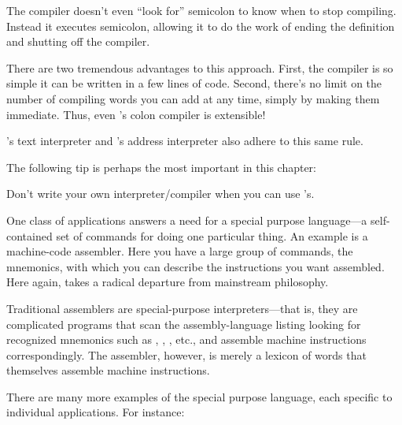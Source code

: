 The compiler doesn't even ``look for'' semicolon to know when to
stop compiling. Instead it executes semicolon, allowing it to do the work
of ending the definition and shutting off the compiler.

There are two tremendous advantages to this approach. First, the
compiler is so simple it can be written in a few lines of code. Second,
there's no limit on the number of compiling words you can add at any
time, simply by making them immediate. Thus, even \Forth{}'s colon
compiler is extensible!

\Forth{}'s text interpreter and \Forth{}'s address interpreter also
adhere to this same rule.

The following tip is perhaps the most important in this chapter:


\begin{tip}
Don't write your own interpreter/compiler when you can use \Forth{}'s.
\end{tip}
One class of applications answers a need for a special purpose
language---a self-contained set of commands for doing one particular
thing. An example is a machine-code assembler. Here you have a large
group of commands, the mnemonics, with which you can describe the
instructions you want assembled. Here again, \Forth{} takes a radical
departure from mainstream philosophy.

Traditional assemblers are special-purpose
interpreters---that is, they are complicated programs that scan the
assembly-language listing looking for recognized mnemonics such as
, , , etc., and
assemble machine instructions correspondingly. The \Forth{} assembler,
however, is merely a lexicon of \Forth{} words that themselves assemble
machine instructions.

There are many more examples of the special purpose language,
each specific to individual applications. For instance:


